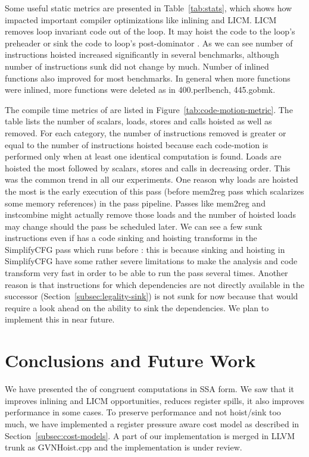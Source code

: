 \documentclass[sigplan,10pt,review,anonymous]{acmart}\settopmatter{printfolios=true,printccs=false,printacmref=false}
\begin{document}
Some useful static metrics are presented in Table~\ref{tab:stats}, which shows
how \gcm{} impacted important compiler optimizations like inlining and
LICM. LICM removes loop invariant code out of the loop. It may hoist the code to
the loop's preheader or sink the code to loop's post-dominator
\cite{steven1997advanced}. As we can see number of instructions hoisted
increased significantly in several benchmarks, although number of instructions
sunk did not change by much.  Number of inlined functions also improved for most
benchmarks. In general when more functions were inlined, more functions were
deleted as in 400.perlbench, 445.gobmk.


The compile time metrics of \GCM{} are listed in
Figure~\ref{tab:code-motion-metric}. The table lists the number of scalars,
loads, stores and calls hoisted as well as removed. For each category, the
number of instructions removed is greater or equal to the number of instructions
hoisted because each code-motion is performed only when at least one identical
computation is found. Loads are hoisted the most followed by scalars, stores and
calls in decreasing order.  This was the common trend in all our
experiments. One reason why loads are hoisted the most is the early execution of
this pass (before mem2reg pass which scalarizes some memory references) in the
\LLVM{} pass pipeline. Passes like mem2reg and instcombine might actually remove
those loads and the number of hoisted loads may change should the \GCM{} pass be
scheduled later. We can see a few sunk instructions even if \LLVM{} has a code
sinking and hoisting transforms in the SimplifyCFG pass which runs before
\GCM{}: this is because sinking and hoisting in SimplifyCFG have some rather
severe limitations to make the analysis and code transform very fast in order to
be able to run the pass several times.  Another reason is that instructions for
which dependencies are not directly available in the successor
(Section~\ref{subsec:legality-sink}) is not sunk for now because that would
require a look ahead on the ability to sink the dependencies. We plan to
implement this in near future.

\section{Conclusions and Future Work}
\label{sec:future-work}

We have presented the \gcm{} of congruent computations in SSA form. We saw that
it improves inlining and LICM opportunities, reduces register spills, it also
improves performance in some cases. To preserve performance and not hoist/sink
too much, we have implemented a register pressure aware cost model as described
in Section~\ref{subsec:cost-models}. A part of our implementation is merged in
LLVM trunk as GVNHoist.cpp and the \GCM{} implementation is under review.
\end{document}
